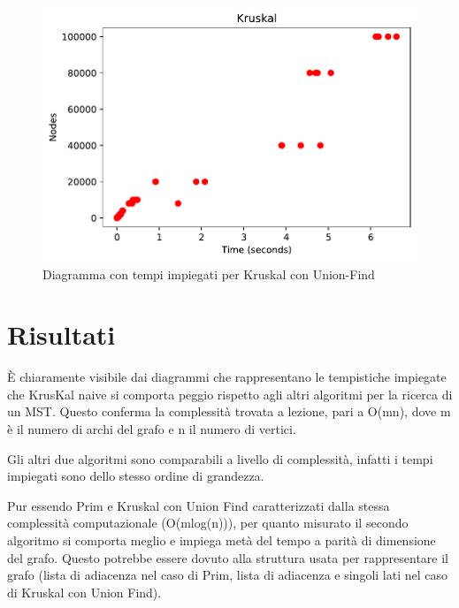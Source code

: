 \begin{figure}[htp]
    \centering
    \includegraphics[width=\textwidth]{immagini/kruskal.pdf}
    \caption{Diagramma con tempi impiegati per Kruskal con Union-Find}
    \label{fig:diagramma-kruskal}
\end{figure}

\clearpage

\section{Risultati\label{sec:risultati}}
È chiaramente visibile dai diagrammi che rappresentano le tempistiche impiegate che KrusKal naive si comporta peggio rispetto agli altri algoritmi per la ricerca di un MST.
Questo conferma la complessità trovata a lezione, pari a O(mn), dove m è il numero di archi del grafo e n il numero di vertici.

Gli altri due algoritmi sono comparabili a livello di complessità, infatti i tempi impiegati sono dello stesso ordine di grandezza.

Pur essendo Prim e Kruskal con Union Find caratterizzati dalla stessa complessità computazionale (O(mlog(n))), per quanto misurato il secondo algoritmo si comporta meglio e impiega metà del tempo a parità di dimensione del grafo.
Questo potrebbe essere dovuto alla struttura usata per rappresentare il grafo (lista di adiacenza nel caso di Prim, lista di adiacenza e singoli lati nel caso di Kruskal con Union Find).